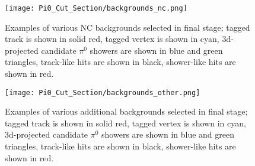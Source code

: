 \documentclass{article}
\begin{document}
\begin{figure}[h!]
\centering
\texttt{[image: Pi0\_Cut\_Section/backgrounds\_nc.png]}
\caption{ Examples of various NC backgrounds selected in final stage; tagged track is shown in solid red, tagged vertex is shown in cyan, 3d-projected candidate $\pi^0$ showers are shown in blue and green triangles, track-like hits are shown in black, shower-like hits are shown in red. }
\label{fig:backgrounds_nc}
\end{figure}

\begin{figure}[h!]
\centering
\texttt{[image: Pi0\_Cut\_Section/backgrounds\_other.png]}
\caption{ Examples of various additional backgrounds selected in final stage; tagged track is shown in solid red, tagged vertex is shown in cyan, 3d-projected candidate $\pi^0$ showers are shown in blue and green triangles, track-like hits are shown in black, shower-like hits are shown in red. }
\label{fig:backgrounds_other}
\end{figure}






\end{document}
